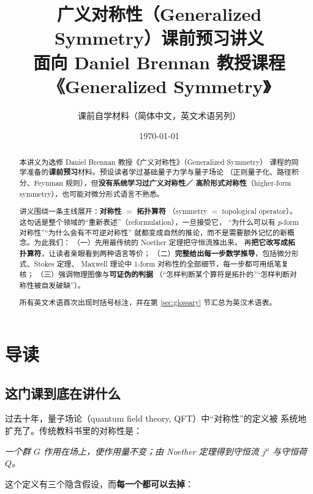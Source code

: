 \documentclass[UTF8,a4paper,11pt]{ctexart}
\title{\bfseries 广义对称性（Generalized Symmetry）课前预习讲义\\[8pt]
       \large 面向 Daniel Brennan 教授课程《Generalized Symmetry》}
\author{课前自学材料（简体中文，英文术语另列）}
\date{\today}
\theoremstyle{plain}
\theoremstyle{definition}
\theoremstyle{remark}
\newcommand{\en}[1]{\textsf{#1}}       %
\begin{document}
\maketitle

\begin{abstract}
\noindent
本讲义为选修 Daniel Brennan 教授《广义对称性》（\en{Generalized Symmetry}）
课程的同学准备的\textbf{课前预习}材料。预设读者学过基础量子力学与量子场论
（正则量子化、路径积分、Feynman 规则），但\textbf{没有系统学习过广义对称性／
高阶形式对称性}（\en{higher-form symmetry}），也可能对微分形式语言不熟悉。

讲义围绕一条主线展开：\textbf{对称性 $=$ 拓扑算符}
（\en{symmetry} $=$ \en{topological operator}）。
这句话是整个领域的“重新表述”（\en{reformulation}），一旦接受它，
“为什么可以有 $p$-form 对称性”“为什么会有不可逆对称性”
就都变成自然的推论，而不是需要额外记忆的新概念。为此我们：
（一）先用最传统的 Noether 定理把守恒流推出来，
再\textbf{把它改写成拓扑算符}，让读者亲眼看到两种语言等价；
（二）\textbf{完整给出每一步数学推导}，包括微分形式、Stokes 定理、
Maxwell 理论中 1-form 对称性的全部细节，每一步都可用纸笔复核；
（三）强调物理图像与\textbf{可证伪的判据}
（“怎样判断某个算符是拓扑的”“怎样判断对称性被自发破缺”）。

所有英文术语首次出现时括号标注，并在第 \ref{sec:glossary} 节汇总为英汉术语表。
\end{abstract}

\vspace{0.4em}
\tableofcontents
\vspace{1.2em}

\section{导读}
\label{sec:guide}

\subsection{这门课到底在讲什么}

过去十年，量子场论（\en{quantum field theory}, QFT）中“对称性”的定义被
系统地扩充了。传统教科书里的对称性是：
\begin{center}
\emph{一个群 $G$ 作用在场上，使作用量不变；由 Noether 定理得到守恒流
$j^\mu$ 与守恒荷 $Q$。}
\end{center}
这个定义有三个隐含假设，而\textbf{每一个都可以去掉}：
\end{document}
